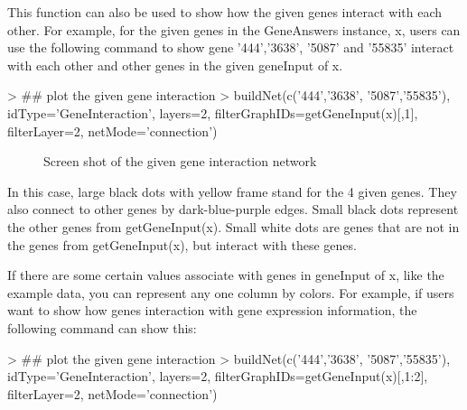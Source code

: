 \documentclass[a4paper]{article}
\begin{document}
This function can also be used to show how the given genes interact with each other. For example, for the given genes in the GeneAnswers instance, x, users can use the following command to show gene '444','3638', '5087' and '55835' interact with each other and other genes in the given geneInput of x.
\begin{Schunk}
\begin{Sinput}
> ## plot the given gene interaction
> buildNet(c('444','3638', '5087','55835'), idType='GeneInteraction', layers=2, filterGraphIDs=getGeneInput(x)[,1], filterLayer=2, netMode='connection')
\end{Sinput}
\end{Schunk}

\begin{figure}
\centering
\centering
{}
\caption{Screen shot of the given gene interaction network}
\label{geneInteractionNetwork}
\end{figure}

In this case, large black dots with yellow frame stand for the 4 given genes. They also connect to other genes by dark-blue-purple edges. Small black dots represent the other genes from getGeneInput(x). Small white dots are genes that are not in the genes from getGeneInput(x), but interact with these genes. 

If there are some certain values associate with genes in geneInput of x, like the example data, you can represent any one column by colors. For example, if users want to show how genes interaction with gene expression information, the following command can show this:
\begin{Schunk}
\begin{Sinput}
> ## plot the given gene interaction
> buildNet(c('444','3638', '5087','55835'), idType='GeneInteraction', layers=2, filterGraphIDs=getGeneInput(x)[,1:2], filterLayer=2, netMode='connection')
\end{Sinput}
\end{Schunk}
\end{document}
